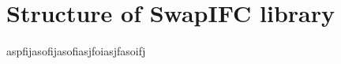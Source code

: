 \chapter{Structure of SwapIFC library}
\label{app:library_structure}
aspfijasofijasofiasjfoiasjfasoifj
